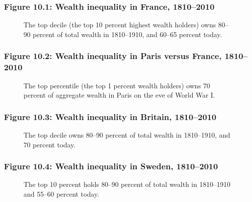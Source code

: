 \documentclass[t]{beamer}\usepackage[]{graphicx}\usepackage[]{color}
\begin{document}
\begin{frame}[label=Figure_10_1]
\frametitle{Figure 10.1: Wealth inequality in France, 1810--2010}
\begin{figure}[t]
\begin{minipage}[b]{\textwidth}
\centering

\caption{The top decile (the top 10 percent highest wealth holders) owns 80--90 percent of total wealth in 1810--1910, and 60--65 percent today.}
\end{minipage}
\end{figure}
\end{frame}


\begin{frame}[label=Figure_10_2]
\frametitle{Figure 10.2: Wealth inequality in Paris versus France, 1810--2010}
\begin{figure}[t]
\begin{minipage}[b]{\textwidth}
\centering

\caption{The top percentile (the top 1 percent wealth holders) owns 70 percent of aggregate wealth in Paris on the eve of World War I.}
\end{minipage}
\end{figure}
\end{frame}


\begin{frame}[label=Figure_10_3]
\frametitle{Figure 10.3: Wealth inequality in Britain, 1810--2010}
\begin{figure}[t]
\begin{minipage}[b]{\textwidth}
\centering

\caption{The top decile owns 80--90 percent of total wealth in 1810--1910, and 70 percent today.}
\end{minipage}
\end{figure}
\end{frame}


\begin{frame}[label=Figure_10_4]
\frametitle{Figure 10.4: Wealth inequality in Sweden, 1810--2010}
\begin{figure}[t]
\begin{minipage}[b]{\textwidth}
\centering

\caption{The top 10 percent holds 80--90 percent of total wealth in 1810--1910 and 55--60 percent today.}
\end{minipage}
\end{figure}
\end{frame}
\end{document}
